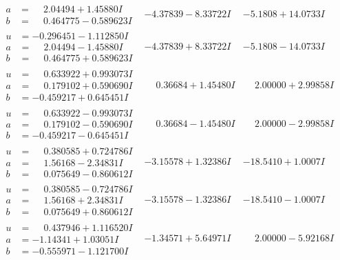 \documentclass[1p]{elsarticle_modified}
\theoremstyle{definition}
\begin{document}
$$\begin{array}{c|c|c}
\begin{aligned}
a &= \phantom{-}2.04494 + 1.45880 I \\
b &= \phantom{-}0.464775 - 0.589623 I\end{aligned}
 & -4.37839 - 8.33722 I & -5.1808 + 14.0733 I \\ \hline\begin{aligned}
u &= -0.296451 - 1.112850 I \\
a &= \phantom{-}2.04494 - 1.45880 I \\
b &= \phantom{-}0.464775 + 0.589623 I\end{aligned}
 & -4.37839 + 8.33722 I & -5.1808 - 14.0733 I \\ \hline\begin{aligned}
u &= \phantom{-}0.633922 + 0.993073 I \\
a &= \phantom{-}0.179102 + 0.590690 I \\
b &= -0.459217 + 0.645451 I\end{aligned}
 & \phantom{-}0.36684 + 1.45480 I & \phantom{-}2.00000 + 2.99858 I \\ \hline\begin{aligned}
u &= \phantom{-}0.633922 - 0.993073 I \\
a &= \phantom{-}0.179102 - 0.590690 I \\
b &= -0.459217 - 0.645451 I\end{aligned}
 & \phantom{-}0.36684 - 1.45480 I & \phantom{-}2.00000 - 2.99858 I \\ \hline\begin{aligned}
u &= \phantom{-}0.380585 + 0.724786 I \\
a &= \phantom{-}1.56168 - 2.34831 I \\
b &= \phantom{-}0.075649 - 0.860612 I\end{aligned}
 & -3.15578 + 1.32386 I & -18.5410 + 1.0007 I \\ \hline\begin{aligned}
u &= \phantom{-}0.380585 - 0.724786 I \\
a &= \phantom{-}1.56168 + 2.34831 I \\
b &= \phantom{-}0.075649 + 0.860612 I\end{aligned}
 & -3.15578 - 1.32386 I & -18.5410 - 1.0007 I \\ \hline\begin{aligned}
u &= \phantom{-}0.437946 + 1.116520 I \\
a &= -1.14341 + 1.03051 I \\
b &= -0.555971 - 1.121700 I\end{aligned}
 & -1.34571 + 5.64971 I & \phantom{-}2.00000 - 5.92168 I \\ \hline\begin{aligned}

\end{aligned}
\end{array}$$
\end{document}
